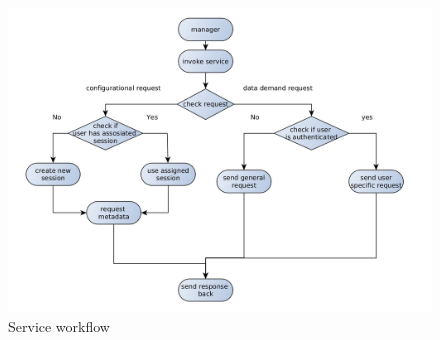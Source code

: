 \begin{figure}[h]
    \centering
	\includegraphics[width=\textwidth]{images/via_service_1.png}
    \caption{Service workflow}
    \label{fig:via_manager}
\end{figure}


